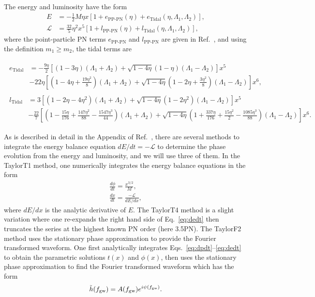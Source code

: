 \documentclass[twocolumn,prd,amssymb,aps,nofootinbib,showpacs,epsf]{revtex4}
\begin{document}
The energy and luminosity have the form
\begin{align}
E &= - \frac{1}{2} M \eta x \left[1 + e_\text{PP-PN}(\eta) + e_\text{Tidal}(\eta, \Lambda_1, \Lambda_2)\right], \\
\mathcal{L} &= \frac{32}{5}\eta^2 x^5 \left[ 1 + l_\text{PP-PN}(\eta) + l_\text{Tidal}(\eta, \Lambda_1, \Lambda_2)\right],
\end{align}
where the point-particle PN terms $e_\text{PP-PN}$ and $l_\text{PP-PN}$ are given in Ref.~\cite{Blanchet2014Review}, and using the definition $m_1 \ge m_2$, the tidal terms are
\begin{widetext}
\begin{align}
\begin{split}
e_\text{Tidal} &= -\frac{9\eta}{2} \left[ (1-3\eta)(\Lambda_1+\Lambda_2) + \sqrt{1-4\eta}(1-\eta)(\Lambda_1-\Lambda_2) \right]x^5 \\
& - 22\eta \left[ \left(1-4\eta+\frac{19\eta^2}{8}\right)(\Lambda_1+\Lambda_2) + \sqrt{1-4\eta}\left(1-2\eta+\frac{3\eta^2}{8}\right)(\Lambda_1-\Lambda_2) \right]x^6,
\end{split} \\
\begin{split}
l_\text{Tidal} &= 3 \left[ (1-2\eta-4\eta^2)(\Lambda_1+\Lambda_2) + \sqrt{1-4\eta}(1-2\eta^2)(\Lambda_1-\Lambda_2) \right]x^5 \\
& - \frac{22}{7} \left[ \left(1-\frac{15\eta}{176}+\frac{147\eta^2}{88}-\frac{1547\eta^3}{44}\right)(\Lambda_1+\Lambda_2) + \sqrt{1-4\eta}\left(1+\frac{337\eta}{176}+\frac{15\eta^2}{2}-\frac{1085\eta^3}{88}\right)(\Lambda_1-\Lambda_2) \right]x^6.
\end{split}
\end{align}
\end{widetext}

As is described in detail in the Appendix of Ref.~\cite{WadeCreightonOchsner2014}, there are several methods to integrate the energy balance equation $dE/dt = -\mathcal{L}$ to determine the phase evolution from the energy and luminosity, and we will use three of them. In the TaylorT1 method, one numerically integrates the energy balance equations in the form
\begin{align}
\label{eq:dpdt}
\frac{d\phi}{dt} = \frac{x^{3/2}}{M},\\
\label{eq:dedt}
\frac{dx}{dt} = \frac{-\mathcal{L}}{dE/dx},
\end{align}
where $dE/dx$ is the analytic derivative of $E$. The TaylorT4 method is a slight variation where one re-expands the right hand side of Eq.~\eqref{eq:dedt} then truncates the series at the highest known PN order (here 3.5PN). The TaylorF2 method uses the stationary phase approximation to provide the Fourier transformed waveform. One first analytically integrates Eqs.~\eqref{eq:dpdt}--\eqref{eq:dedt} to obtain the parametric solutions $t(x)$ and $\phi(x)$, then uses the stationary phase approximation to find the Fourier transformed waveform which has the form
\begin{equation}
\tilde h(f_{\rm gw}) = A(f_{\rm gw}) e^{i \psi(f_{\rm gw})}.
\end{equation}
\end{document}
